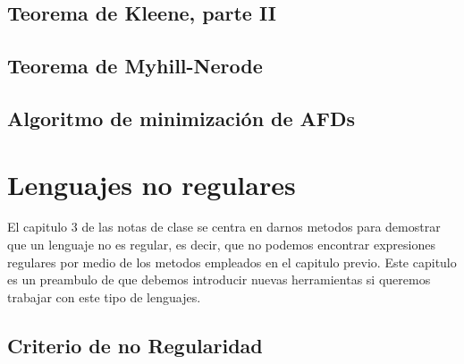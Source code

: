 \documentclass[12pt,a4paper]{book}
\begin{document}
    \section{Teorema de Kleene, parte II}
        
    \section{Teorema de Myhill-Nerode}
        
    \section{Algoritmo de minimización de AFDs}
        
\chapter{Lenguajes no regulares}
El capitulo 3 de las notas de clase se centra en darnos metodos para demostrar que un lenguaje no es regular, es decir, que no podemos encontrar expresiones regulares por medio de los metodos empleados en el capitulo previo. Este capitulo es un preambulo de que debemos introducir nuevas herramientas si queremos trabajar con este tipo de lenguajes.
    \section{Criterio de no Regularidad}
        
\end{document}

